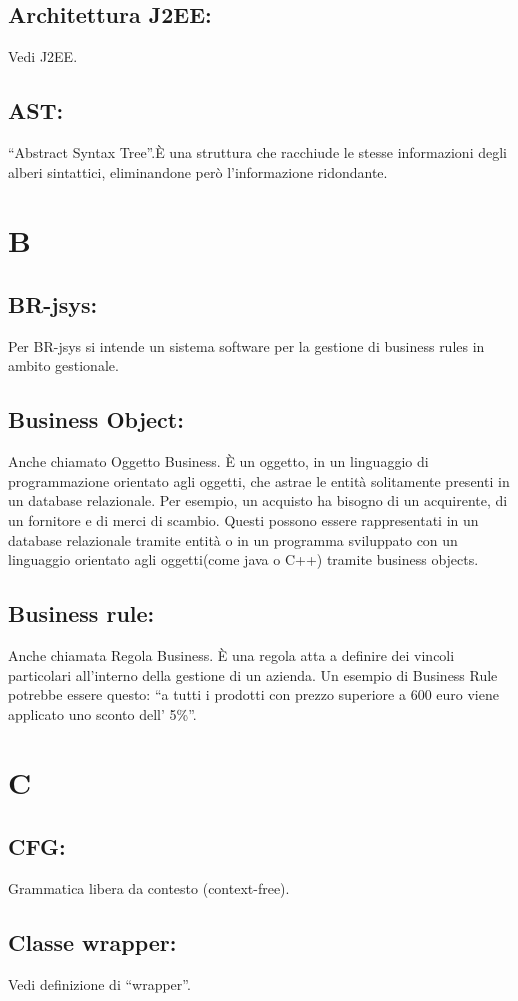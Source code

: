 \documentclass[11pt,titlepage,a4paper]{report}
\begin{document}
\section{Architettura J2EE:}
Vedi J2EE.
\section{AST:} 
``Abstract Syntax Tree''.\`E una struttura che racchiude le stesse informazioni degli alberi sintattici, eliminandone per\`o l'informazione ridondante.

\chapter{B}
\section{BR-jsys:}
Per BR-jsys si intende un sistema software per la gestione di business rules in ambito gestionale.
\section{Business Object:}
Anche chiamato Oggetto Business. \`E un oggetto, in un linguaggio di programmazione orientato agli oggetti, che astrae le entit\`a solitamente presenti in un database relazionale.
Per esempio, un acquisto ha bisogno di un acquirente, di un fornitore e di merci di scambio. Questi possono essere rappresentati in un database relazionale tramite entit\`a o in un programma sviluppato con un linguaggio orientato agli oggetti(come java o C++) tramite business objects.
\section{Business rule:}
Anche chiamata Regola Business. \`E una regola atta a definire dei vincoli particolari all'interno della gestione di un azienda. Un esempio di Business Rule potrebbe essere questo: ``a tutti i prodotti con prezzo superiore a 600 euro  viene applicato uno sconto dell' 5\%''.

\chapter{C}
\section{CFG:}
Grammatica libera da contesto (context-free). 
\section{Classe wrapper:}
Vedi definizione di ``wrapper''.
\end{document}
